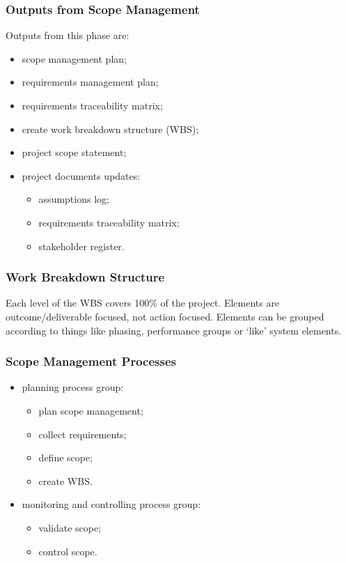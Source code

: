 \documentclass[journal]{IEEEtran}
\begin{document}
\subsubsection{Outputs from Scope Management}
Outputs from this phase are:
\begin{itemize}
	\item scope management plan;
	\item requirements management plan;
	\item requirements traceability matrix;
	\item create work breakdown structure (WBS);
	\item project scope statement;
	\item project documents updates:
	\begin{itemize}
		\item assumptions log;
		\item requirements traceability matrix;
		\item stakeholder register.		
	\end{itemize}
\end{itemize}
\subsubsection{Work Breakdown Structure}
Each level of the WBS covers 100\% of the project. Elements are outcome/deliverable focused, not action focused. Elements can be grouped according to things like phasing, performance groups or `like' system elements.
\subsubsection{Scope Management Processes}
\begin{itemize}
	\item planning process group:
	\begin{itemize}
		\item plan scope management;
		\item collect requirements;
		\item define scope;
		\item create WBS.		
	\end{itemize}
	\item monitoring and controlling process group:
	\begin{itemize}
		\item validate scope;
		\item control scope.		
	\end{itemize}
\end{itemize}
\end{document}
